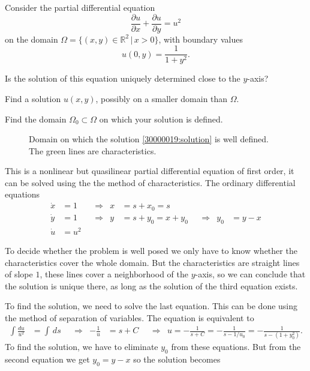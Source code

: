 Consider the partial differential equation
\[
\frac{\partial u}{\partial x} + \frac{\partial u}{\partial y}
=
u^2
\]
on the domain $\Omega = \{ (x,y)\in\mathbb R^2\,|\, x>0\}$, with
boundary values
\[
u(0,y) = \frac{1}{1+y^2}.
\]
\begin{teilaufgaben}
\item
Is the solution of this equation uniquely determined close to the
$y$-axis?
\item
Find a solution $u(x,y)$, possibly on a smaller domain than $\Omega$.
\item
Find the domain $\Omega_0\subset\Omega$ on which your solution is defined.
\end{teilaufgaben}

\begin{loesung}
\begin{figure}
\centering
{}
\caption{Domain on which the solution \eqref{30000019:solution} is
well defined.
The green lines are characteristics.
\label{30000019:figure}}
\end{figure}%
This is a nonlinear but quasilinear partial differential equation of first
order, it can be solved using the the method of characteristics.
The ordinary differential equations
\begin{align*}
\dot{x} &= 1 &&\Rightarrow& x&=s + x_0 = s\\
\dot{y} &= 1 &&\Rightarrow& y&=s + y_0 = x + y_0&&\Rightarrow&y_0&=y-x\\
\dot{u} &= u^2
\end{align*}
\begin{teilaufgaben}
\item
To decide whether the problem is well posed we only have to know whether
the characteristics cover the whole domain.
But the characteristics are straight lines of slope $1$, these lines
cover a neighborhood of the $y$-axis, so we can conclude that the
solution is unique there, as long as the solution of the third equation 
exists.
\item
To find the solution, we need to solve the last equation.
This can be done using the method of separation of variables.
The equation is equivalent to
\begin{align*}
\int\frac{du}{u^2} &= \int \,ds
&&\Rightarrow&
-\frac1{u} &= s + C
&&\Rightarrow&
u = -\frac{1}{s+C} = -\frac{1}{s-1/u_0} = -\frac{1}{s-(1+y_0^2)}.
\end{align*}
To find the solution, we have to eliminate $y_0$ from these equations.
But from the second equation we get $y_0=y-x$ so the solution becomes

\end{teilaufgaben}
\end{loesung}
